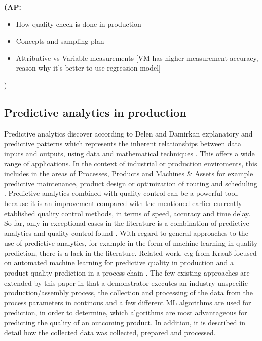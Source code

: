 \documentclass[5p,times,procedia]{elsarticle}
\newcommand{\AP}[1]{{\color{blue} {\bf (AP: #1)}}}
\begin{document}
\AP{
\begin{itemize}
\item How quality check is done in production
\item Concepts and sampling plan
\item Attributive vs Variable measurements [VM has higher measurement accuracy, reason why it’s better to use regression model]
\end{itemize}}

\subsection{Predictive analytics in production}

Predictive analytics discover according to Delen and Damirkan explanatory and predictive patterns which represents 
the inherent relationships between data inputs and outputs, using data and mathematical techniques \cite{delen2013data}. 
This offers a wide range of applications. In the context of industrial or production enviroments, this includes in the areas of Processes, Products and Machines & Assets for example 
predictive maintenance, product design or optimization of routing and scheduling \cite{krauss2019machine}. 
Predictive analytics combined with quality control can be a powerful tool, because it is an improvement compared with the mentioned earlier currently
etablished quality control methods, in terms of speed, accuracy and time delay.
So far, only in exceptional cases in the literature is a combination of predictive analytics and quality control found \cite{aumi2012model, ritter1992neue}. With regard to general approaches to the use of predictive analytics,
for example in the form of machine learning in quality prediction, there is a lack in the literature. 
Related work, e.g from Krauß focused on automated machine learning for predictive quality in production \cite{krauss2020automated} and a product quality prediction in a process chain \cite{krauss2019machine}. 
The few existing approaches are extended by this paper in that a demonstrator executes an industry-unspecific production/assembly process,
the collection and processing of the data from the process parameters in continous and a few different ML algorithms are used for prediction, 
in order to determine, which algorithms are most advantageous for predicting the quality of an outcoming product. 
In addition, it is described in detail how the collected data was collected, prepared and processed.
\end{document}
